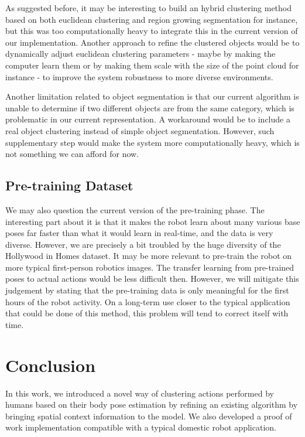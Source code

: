 As suggested before, it may be interesting to build an hybrid clustering method based on both euclidean clustering and region growing segmentation for instance, but this was too computationally heavy to integrate this in the current version of our implementation. Another approach to refine the clustered objects would be to dynamically adjust euclidean clustering parameters - maybe by making the computer learn them or by making them scale with the size of the point cloud for instance - to improve the system robustness to more diverse environments.

Another limitation related to object segmentation is that our current algorithm is unable to determine if two different objects are from the same category, which is problematic in our current representation. A workaround would be to include a real object clustering instead of simple object segmentation. However, such supplementary step would make the system more computationally heavy, which is not something we can afford for now.

\subsection{Pre-training Dataset}
We may also question the current version of the pre-training phase. The interesting part about it is that it makes the robot learn about many various base poses far faster than what it would learn in real-time, and the data is very diverse. However, we are precisely a bit troubled by the huge diversity of the Hollywood in Homes dataset. It may be more relevant to pre-train the robot on more typical first-person robotics images. The transfer learning from pre-trained poses to actual actions would be less difficult then. However, we will mitigate this judgement by stating that the pre-training data is only meaningful for the first hours of the robot activity. On a long-term use closer to the typical application that could be done of this method, this problem will tend to correct itself with time.

\pagebreak
\section{Conclusion}
In this work, we introduced a novel way of clustering actions performed by humans based on their body pose estimation by refining an existing algorithm by bringing spatial context information to the model. We also developed a proof of work implementation compatible with a typical domestic robot application. 

